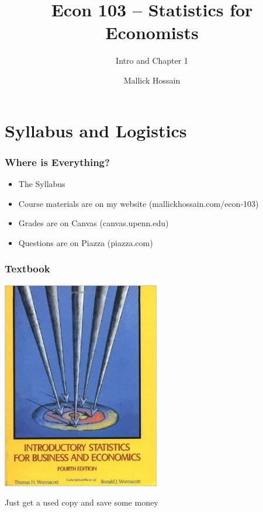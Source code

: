 \documentclass{beamer}
\title{Econ 103 -- Statistics for Economists}
\subtitle{Intro and Chapter 1}
\author{Mallick Hossain}
\date{}
\institute{University of Pennsylvania}
\begin{document}
 

\begin{frame}
	\titlepage 
\end{frame} 

\section{Syllabus and Logistics}
\begin{frame}
\frametitle{Where is Everything?}
	\begin{itemize}[<+- | alert@+>]
		\item  The Syllabus
		\item Course materials are on my website (mallickhossain.com/econ-103)
		\item Grades are on Canvas (canvas.upenn.edu)
		\item Questions are on Piazza (piazza.com)
	\end{itemize}
\end{frame}

\begin{frame}
\frametitle{Textbook}
	\begin{center}
		\includegraphics[scale=0.5]{./images/textbook.jpeg}
	\end{center}
	\centering
	Just get a used copy and save some money
\end{frame}
\end{document}
